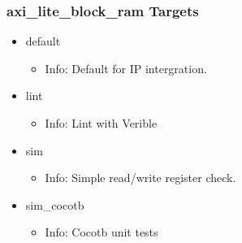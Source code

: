 \subsubsection{axi\_lite\_block\_ram Targets}
\begin{itemize}
\item default
	\begin{itemize}
	\item[$\space$] Info: Default for IP intergration.
	\end{itemize}
\item lint
	\begin{itemize}
	\item[$\space$] Info: Lint with Verible
	\end{itemize}
\item sim
	\begin{itemize}
	\item[$\space$] Info: Simple read/write register check.
	\end{itemize}
\item sim\_cocotb
	\begin{itemize}
	\item[$\space$] Info: Cocotb unit tests
	\end{itemize}
\end{itemize}
